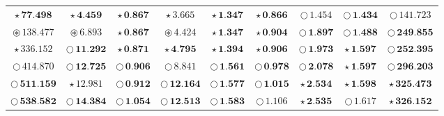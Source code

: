 \documentclass[
]{article}
\begin{document}
\begin{table}[!h]
\begin{tabular}[t]{ccccccccc}
\cellcolor[HTML]{F5C710}$\star\,\textbf{77.498}$ & \cellcolor[HTML]{F5C710}$\star\,\textbf{4.459}$ & \cellcolor[HTML]{2297E6}$\star\,\textbf{0.867}$ & \cellcolor[HTML]{F5C710}$\star\,\textit{3.665}$ & \cellcolor[HTML]{2297E6}$\star\,\textbf{1.347}$ & \cellcolor[HTML]{F5C710}$\star\,\textbf{0.866}$ & \cellcolor[HTML]{FFFFFF}$\bigcirc\,1.454$ & \cellcolor[HTML]{DF536B}$\bigcirc\,\textbf{1.434}$ & \cellcolor[HTML]{FFFFFF}$\bigcirc\,141.723$\\
\cellcolor[HTML]{F5C710}$\circledast\,\textit{138.477}$ & \cellcolor[HTML]{F5C710}$\circledast\,\textit{6.893}$ & \cellcolor[HTML]{DF536B}$\star\,\textbf{0.867}$ & \cellcolor[HTML]{F5C710}$\circledast\,\textit{4.424}$ & \cellcolor[HTML]{DF536B}$\star\,\textbf{1.347}$ & \cellcolor[HTML]{2297E6}$\star\,\textbf{0.904}$ & \cellcolor[HTML]{2297E6}$\bigcirc\,\textbf{1.897}$ & \cellcolor[HTML]{2297E6}$\bigcirc\,\textbf{1.488}$ & \cellcolor[HTML]{2297E6}$\bigcirc\,\textbf{249.855}$\\
\cellcolor[HTML]{F5C710}$\star\,\textit{336.152}$ & \cellcolor[HTML]{DF536B}$\bigcirc\,\textbf{11.292}$ & \cellcolor[HTML]{F5C710}$\star\,\textbf{0.871}$ & \cellcolor[HTML]{F5C710}$\star\,\textbf{4.795}$ & \cellcolor[HTML]{F5C710}$\star\,\textbf{1.394}$ & \cellcolor[HTML]{DF536B}$\star\,\textbf{0.906}$ & \cellcolor[HTML]{DF536B}$\bigcirc\,\textbf{1.973}$ & \cellcolor[HTML]{DF536B}$\star\,\textbf{1.597}$ & \cellcolor[HTML]{DF536B}$\bigcirc\,\textbf{252.395}$\\
\cellcolor[HTML]{FFFFFF}$\bigcirc\,414.870$ & \cellcolor[HTML]{2297E6}$\bigcirc\,\textbf{12.725}$ & \cellcolor[HTML]{DF536B}$\bigcirc\,\textbf{0.906}$ & \cellcolor[HTML]{FFFFFF}$\bigcirc\,8.841$ & \cellcolor[HTML]{F5C710}$\bigcirc\,\textbf{1.561}$ & \cellcolor[HTML]{2297E6}$\bigcirc\,\textbf{0.978}$ & \cellcolor[HTML]{F5C710}$\bigcirc\,\textbf{2.078}$ & \cellcolor[HTML]{2297E6}$\star\,\textbf{1.597}$ & \cellcolor[HTML]{F5C710}$\bigcirc\,\textbf{296.203}$\\
\cellcolor[HTML]{DF536B}$\bigcirc\,\textbf{511.159}$ & \cellcolor[HTML]{F5C710}$\star\,\textit{12.981}$ & \cellcolor[HTML]{2297E6}$\bigcirc\,\textbf{0.912}$ & \cellcolor[HTML]{2297E6}$\bigcirc\,\textbf{12.164}$ & \cellcolor[HTML]{2297E6}$\bigcirc\,\textbf{1.577}$ & \cellcolor[HTML]{DF536B}$\bigcirc\,\textbf{1.015}$ & \cellcolor[HTML]{2297E6}$\star\,\textbf{2.534}$ & \cellcolor[HTML]{F5C710}$\star\,\textbf{1.598}$ & \cellcolor[HTML]{F5C710}$\star\,\textbf{325.473}$\\
\cellcolor[HTML]{2297E6}$\bigcirc\,\textbf{538.582}$ & \cellcolor[HTML]{F5C710}$\bigcirc\,\textbf{14.384}$ & \cellcolor[HTML]{F5C710}$\bigcirc\,\textbf{1.054}$ & \cellcolor[HTML]{DF536B}$\bigcirc\,\textbf{12.513}$ & \cellcolor[HTML]{DF536B}$\bigcirc\,\textbf{1.583}$ & \cellcolor[HTML]{FFFFFF}$\bigcirc\,1.106$ & \cellcolor[HTML]{DF536B}$\star\,\textbf{2.535}$ & \cellcolor[HTML]{FFFFFF}$\bigcirc\,1.617$ & \cellcolor[HTML]{2297E6}$\star\,\textbf{326.152}$\\

\end{tabular}
\end{table}
\end{document}
